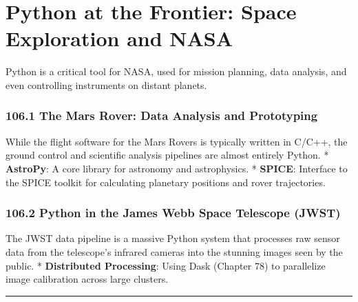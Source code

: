 \hypertarget{python-at-the-frontier-space-exploration-and-nasa}{%
\chapter{Python at the Frontier: Space Exploration and
NASA}\label{python-at-the-frontier-space-exploration-and-nasa}}

Python is a critical tool for NASA, used for mission planning, data
analysis, and even controlling instruments on distant planets.

\hypertarget{the-mars-rover-data-analysis-and-prototyping}{%
\subsection{106.1 The Mars Rover: Data Analysis and
Prototyping}\label{the-mars-rover-data-analysis-and-prototyping}}

While the flight software for the Mars Rovers is typically written in
C/C++, the ground control and scientific analysis pipelines are almost
entirely Python. * \textbf{AstroPy}: A core library for astronomy and
astrophysics. * \textbf{SPICE}: Interface to the SPICE toolkit for
calculating planetary positions and rover trajectories.

\hypertarget{python-in-the-james-webb-space-telescope-jwst}{%
\subsection{106.2 Python in the James Webb Space Telescope
(JWST)}\label{python-in-the-james-webb-space-telescope-jwst}}

The JWST data pipeline is a massive Python system that processes raw
sensor data from the telescope's infrared cameras into the stunning
images seen by the public. * \textbf{Distributed Processing}: Using Dask
(Chapter 78) to parallelize image calibration across large clusters.

\begin{center}\rule{0.5\linewidth}{0.5pt}\end{center}

